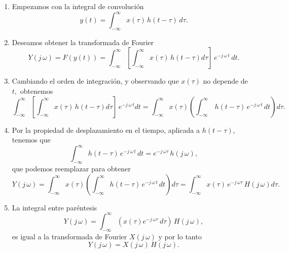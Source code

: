 \begin{enumerate}
\item Empezamos con la integral de convoluci\'{o}n 
\begin{equation}
        y\left( t\right) =
                \int_{-\infty }^{\infty }       x\left( \tau \right) \, h\left(t-\tau \right)      \, d\tau .
\end{equation}
\item Deseamos obtener la transformada de Fourier 
\begin{equation}
        Y\left( j \, \omega \right) =
                F\left( y\left( t\right) \right) =
                \int_{-\infty}^{\infty }
                  \left[ \int_{-\infty }^{\infty }x\left( \tau \right) \, h\left(t-\tau \right) d\tau \right] \,
                   e^{-j \, \omega \, t} \, dt.
\end{equation}
\item Cambiando el orden de integraci\'{o}n, y observando que $x\left( \tau\right) $ no depende de $t,$ obtenemos 
\begin{equation}
        \int_{-\infty }^{\infty }
                \left[ \int_{-\infty }^{\infty }
                        x\left( \tau\right) \, h\left( t-\tau \right) 
                d\tau \right] \, e^{-j \, \omega \, t}
        dt =
        \int_{-\infty}^{\infty }
                x\left( \tau \right) 
                \left( \int_{-\infty }^{\infty } \, h\left(t-\tau \right) \, e^{-j \, \omega \, t}    \, dt\right) 
        d\tau .
\end{equation}
\item Por la propiedad de desplazamiento en el tiempo, aplicada a $h(t - \tau)$, tenemos que 
\begin{equation}
        \int_{-\infty }^{\infty }h\left( t-\tau \right) \, e^{-j \, \omega \, t} \, dt=
                e^{-j \, \omega \tau } \, h\left( j \, \omega \right) ,
\end{equation}
que podemos reemplazar para obtener 
\begin{equation}
        Y\left( j \, \omega \right) =
        \int_{-\infty }^{\infty }
                x\left( \tau \right)
                \left( \int_{-\infty }^{\infty }h\left( t-\tau \right) \, e^{-j \, \omega \, t} \, dt\right) 
                d\tau =
       \int_{-\infty }^{\infty }x\left( \tau \right) \, e^{-j \, \omega\tau } \, H\left( j \, \omega \right) d\tau .
\end{equation}
\item La integral entre par\'{e}ntesis 
\begin{equation}
        Y\left( j \, \omega \right) =
        \int_{-\infty }^{\infty }
        \left( x\left( \tau\right) e^{-j \, \omega \tau } \, d\tau \right) \, H\left( j \, \omega \right),
\end{equation}
es igual a la transformada de Fourier $X\left( j \, \omega \right) $ y por lo
tanto 
\begin{equation}
        Y\left( j \, \omega \right) = X\left( j \, \omega \right) \, H\left( j \, \omega \right) .
\end{equation}


\end{enumerate}
